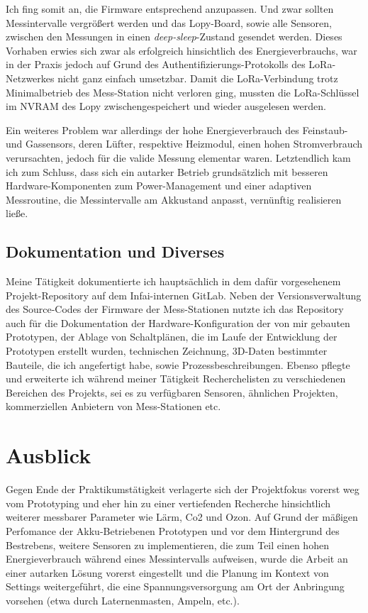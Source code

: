 \documentclass[a4paper,11pt]{article}
\begin{document}
Ich fing somit an, die Firmware entsprechend anzupassen. Und zwar sollten
Messintervalle vergrößert werden und das Lopy-Board, sowie alle Sensoren,
zwischen den Messungen in einen \textit{deep-sleep}-Zustand gesendet werden.
Dieses Vorhaben erwies sich zwar als erfolgreich hinsichtlich des
Energieverbrauchs, war in der Praxis jedoch auf Grund des
Authentifizierungs-Protokolls des LoRa-Netzwerkes nicht ganz einfach
umsetzbar. Damit die LoRa-Verbindung trotz Minimalbetrieb des Mess-Station
nicht verloren ging, mussten die LoRa-Schlüssel im NVRAM des Lopy
zwischengespeichert und wieder ausgelesen werden.

Ein weiteres Problem war allerdings der hohe Energieverbrauch des Feinstaub-
und Gassensors, deren Lüfter, respektive Heizmodul, einen hohen Stromverbrauch
verursachten, jedoch für die valide Messung elementar waren. Letztendlich kam
ich zum Schluss, dass sich ein autarker Betrieb grundsätzlich mit besseren
Hardware-Komponenten zum Power-Management und einer adaptiven Messroutine, die
Messintervalle am Akkustand anpasst, vernünftig realisieren ließe.

\subsection{Dokumentation und Diverses}

Meine Tätigkeit dokumentierte ich hauptsächlich in dem dafür vorgesehenem
Projekt-Reposi\-tory auf dem Infai-internen GitLab. Neben der
Versionsverwaltung des Source-Codes der Firmware der Mess-Stationen nutzte ich
das Repository auch für die Dokumentation der Hardware-Konfiguration der von
mir gebauten Prototypen, der Ablage von Schaltplänen, die im Laufe der
Entwicklung der Prototypen erstellt wurden, technischen Zeichnung, 3D-Daten
bestimmter Bauteile, die ich angefertigt habe, sowie
Prozessbeschreibungen. Ebenso pflegte und erweiterte ich während meiner
Tätigkeit Recherchelisten zu verschiedenen Bereichen des Projekts, sei es zu
verfügbaren Sensoren, ähnlichen Projekten, kommerziellen Anbietern von
Mess-Stationen etc.

\section{Ausblick}
\label{section:ausblick}

Gegen Ende der Praktikumstätigkeit verlagerte sich der Projektfokus vorerst
weg vom Prototyping und eher hin zu einer vertiefenden Recherche hinsichtlich
weiterer messbarer Parameter wie Lärm, Co2 und Ozon. Auf Grund der mäßigen
Perfomance der Akku-Betriebenen Prototypen und vor dem Hintergrund des
Bestrebens, weitere Sensoren zu implementieren, die zum Teil einen hohen
Energieverbrauch während eines Messintervalls aufweisen, wurde die Arbeit an
einer autarken Lösung vorerst eingestellt und die Planung im Kontext von
Settings weitergeführt, die eine Spannungsversorgung am Ort der Anbringung
vorsehen (etwa durch Laternenmasten, Ampeln, etc.).
\end{document}
